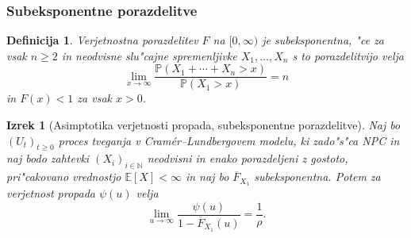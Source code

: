 \documentclass[]{beamer} %
\theoremstyle{plain}
\newtheorem{izrek}{Izrek}
\newtheorem{definicija}{Definicija}
\newcommand{\N}{\mathbb{N}}
\newcommand{\E}{\mathbb{E}}
\newcommand{\Prob}{\mathbb{P}}
\begin{document}
\begin{frame}
  \frametitle{Subeksponentne porazdelitve}
  \begin{definicija}
    Verjetnostna porazdelitev $F$ na $[0, \infty)$ je \textit{subeksponentna}, "ce za vsak $n\geq2$ in 
    neodvisne slu"cajne spremenljivke $X_1, \dots, X_n$ s to porazdelitvijo velja 
    \begin{equation*}
        \lim_{x\to\infty}\frac{\Prob\left(X_1 + \cdots + X_n > x\right)}{\Prob\left(X_1 > x\right)} = n
    \end{equation*}
    in $F(x) < 1$ za vsak $x > 0$.
    \label{def:subeksponentnaPorazdelitev}
  \end{definicija}
\end{frame}

\begin{frame}
  \begin{izrek}[Asimptotika verjetnosti propada, subeksponentne porazdelitve]
    Naj bo $(U_t)_{t\geq0}$ proces tveganja v Cramér--Lundbergovem modelu, ki zado"s"ca NPC in 
    naj bodo zahtevki $(X_i)_{i\in\N}$ neodvisni in enako porazdeljeni z gostoto, 
    pri"cakovano vrednostjo $\E\left[X\right] < \infty$ in naj bo $\overline{F}_{X_1}$ subeksponentna.
    Potem za verjetnost propada $\psi(u)$ velja
    \begin{equation*}
        \lim_{u\to\infty}\frac{\psi(u)}{1 - \overline{F}_{X_1}(u)} = \frac{1}{\rho}.
        \label{eq:tezkorepnePorazdelitveAsimptotika}
    \end{equation*}
    \label{izr:tezkorepnePorazdelitveAsimptotika}
  \end{izrek}
\end{frame}
\end{document}
